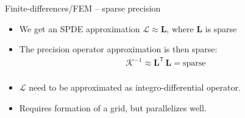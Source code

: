 \documentclass[first=dgreen,second=purple,presentation]{elecslides}
\begin{document}
\begin{frame}{Finite-differences/FEM -- sparse precision}
\begin{itemize}[<+->]
\setcounter{enumi}{2}
\item We get an SPDE approximation $\mathcal{L} \approx \mathbf{L}$, where $\mathbf{L}$ is \alert{sparse} %
\item The \alert{precision operator} approximation is then \alert{sparse}:
\begin{equation}
\begin{split}
  \mathcal{K}^{-1} \approx \mathbf{L}^\mathsf{T} \, \mathbf{L} = \text{sparse}\\
\end{split}
\nonumber
\end{equation}

\item $\mathcal{L}$ need to be approximated as \alert{integro-differential operator}.

\item Requires formation of a \alert{grid}, but parallelizes well.

\end{itemize}


\end{frame}

%
\end{document}
